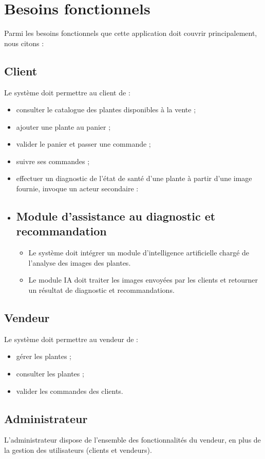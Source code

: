 \section{Besoins fonctionnels}

Parmi les besoins fonctionnels que cette application doit couvrir principalement, nous citons :

\subsection*{Client}
Le système doit permettre au client de :
\begin{itemize}
    \item consulter le catalogue des plantes disponibles à la vente ;
    \item ajouter une plante au panier ;
    \item valider le panier et passer une commande ;
    \item suivre ses commandes ;
    \item effectuer un diagnostic de l'état de santé d'une plante à partir d'une image fournie, invoque un acteur secondaire :
    \item \subsection*{Module d'assistance au diagnostic et recommandation}
\begin{itemize}
    \item Le système doit intégrer un module d'intelligence artificielle chargé de l'analyse des images des plantes.
    \item Le module IA doit traiter les images envoyées par les clients et retourner un résultat de diagnostic et recommandations.
\end{itemize}
\end{itemize}

\subsection*{Vendeur}
Le système doit permettre au vendeur de :
\begin{itemize}
    \item gérer les plantes ;
    \item consulter les plantes ;
    \item valider les commandes des clients.
\end{itemize}

\subsection*{Administrateur}
L'administrateur dispose de l'ensemble des fonctionnalités du vendeur, en plus de la gestion des utilisateurs (clients et vendeurs).

